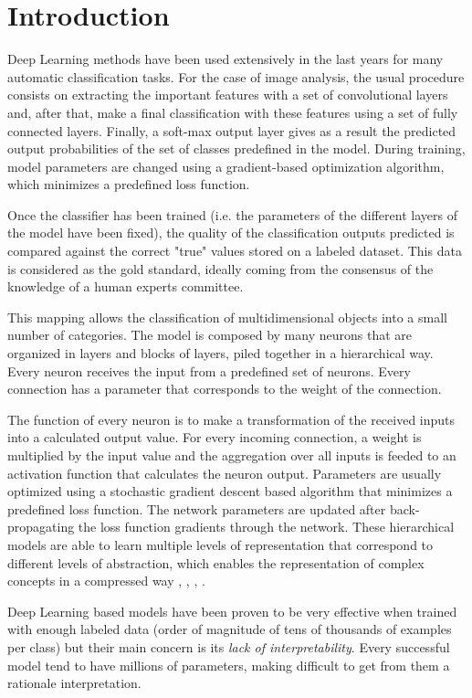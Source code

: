 \documentclass[preprint]{elsarticle}
\theoremstyle{definition} %
\theoremstyle{remark}
\begin{document}
\section{Introduction}

Deep Learning methods have been used extensively in the last years for many automatic classification tasks. For the case of image analysis, the usual procedure consists on extracting the important features with a set of convolutional layers and, after that, make a final classification with these features using a set of fully connected layers. Finally, a soft-max output layer gives as a result the predicted output probabilities of the set of classes predefined in the model. During training, model parameters are changed using a gradient-based optimization algorithm, which minimizes a predefined loss function. 

Once the classifier has been trained (i.e. the parameters of the different layers of the model have been fixed), the quality of the classification outputs predicted is compared against the correct "true" values stored on a labeled dataset. This data is considered as the gold standard, ideally coming from the consensus of the knowledge of a human experts committee.

This mapping allows the classification of multidimensional objects into a small number of categories. The model is composed by many neurons that are organized in layers and blocks of layers, piled together in a hierarchical way. Every neuron receives the input from a predefined set of neurons. Every connection has a parameter that corresponds to the weight of the connection. 

The function of every neuron is to make a transformation of the received inputs into a calculated output value. For every incoming connection, a weight is multiplied by the input value and the aggregation over all inputs is feeded to an activation function that calculates the neuron output. Parameters are usually optimized using a stochastic gradient descent based algorithm that minimizes a predefined loss function. The network parameters are updated after back-propagating the loss function gradients through the network. These hierarchical models are able to learn multiple levels of representation that correspond to different levels of abstraction, which enables the representation of complex concepts in a compressed way \cite{nature-deep-learning}, \cite{888}, \cite{Bengio:2013:RLR:2498740.2498889}, \cite{bengio-2009}.
 
Deep Learning based models have been proven to be very effective when trained with enough labeled data (order of magnitude of tens of thousands of examples per class) but their main concern is its \emph{lack of interpretability}. Every successful model tend to have millions of parameters, making difficult to get from them a rationale interpretation. 
\end{document}
